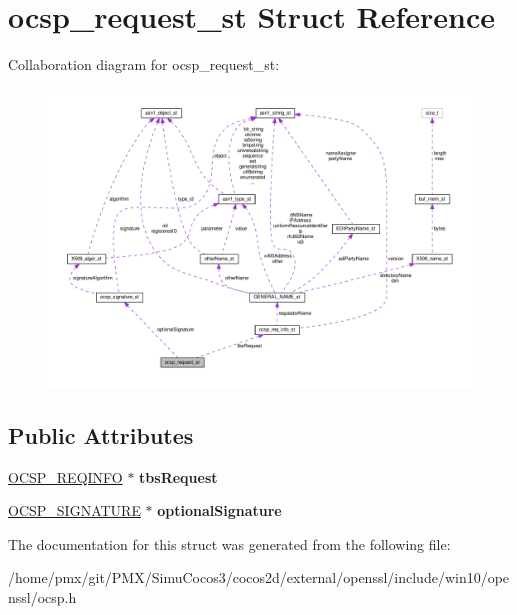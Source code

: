 \hypertarget{structocsp__request__st}{}\section{ocsp\+\_\+request\+\_\+st Struct Reference}
\label{structocsp__request__st}


Collaboration diagram for ocsp\+\_\+request\+\_\+st\+:
\nopagebreak
\begin{figure}[H]
\begin{center}
\leavevmode
\includegraphics[width=350pt]{structocsp__request__st__coll__graph}
\end{center}
\end{figure}
\subsection*{Public Attributes}
\begin{DoxyCompactItemize}
\item 
\mbox{\label{structocsp__request__st_a743dcc34d9ff06fe9635118c0a0030c0}} 
\hyperlink{structocsp__req__info__st}{O\+C\+S\+P\+\_\+\+R\+E\+Q\+I\+N\+FO} $\ast$ {\bfseries tbs\+Request}
\item 
\mbox{\label{structocsp__request__st_a97762bfa4b2c09c1811bfe21882fce5a}} 
\hyperlink{structocsp__signature__st}{O\+C\+S\+P\+\_\+\+S\+I\+G\+N\+A\+T\+U\+RE} $\ast$ {\bfseries optional\+Signature}
\end{DoxyCompactItemize}


The documentation for this struct was generated from the following file\+:\begin{DoxyCompactItemize}
\item 
/home/pmx/git/\+P\+M\+X/\+Simu\+Cocos3/cocos2d/external/openssl/include/win10/openssl/ocsp.\+h\end{DoxyCompactItemize}
